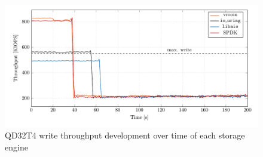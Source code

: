 \begin{figure}
  \centering
    \includegraphics[width=\textwidth]{figures/iops-time-tmp}
    \caption{QD32T4 write throughput development over time of each storage engine}
    \label{fig:iops-time-all}
\end{figure}

